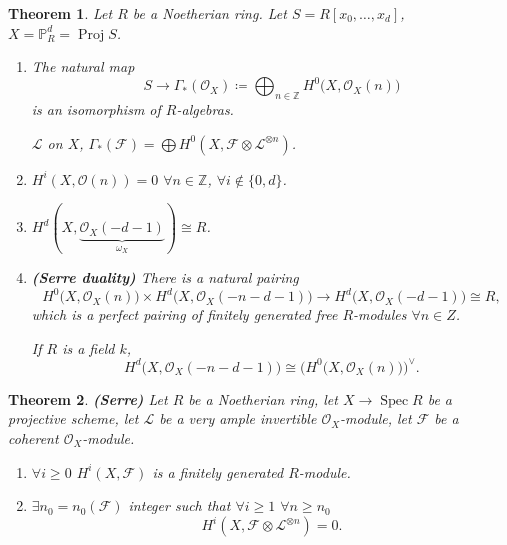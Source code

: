 \documentclass[12pt]{article}
\DeclareMathOperator{\Spec}{Spec}
\DeclareMathOperator{\Proj}{Proj}
\newtheorem*{theorem}{Theorem}
\theoremstyle{definition}
\theoremstyle{remark}
\newtheorem*{comment}{Comment}
\begin{document}
\begin{theorem}
Let $R$ be a Noetherian ring. Let $S=R[x_0,\ldots,x_d]$, $X=\mathbb{P}_R^d=\Proj S$.

\begin{enumerate}[label=\arabic*)]
\item The natural map
\[S\longrightarrow\Gamma_*(\mathcal{O}_X)\coloneqq\bigoplus_{n\in\mathbb{Z}}H^0\big(X,\mathcal{O}_X(n)\big)\]
is an isomorphism of $R$-algebras.

$\mathcal{L}$ on $X$, $\Gamma_*(\mathcal{F})=\bigoplus H^0(X,\mathcal{F}\otimes\mathcal{L}^{\otimes n})$.

\item $H^i(X,\mathcal{O}(n))=0$ $\forall n\in\mathbb{Z}$, $\forall i\notin\{0,d\}$.

\item $H^d(X,\underbrace{\mathcal{O}_X(-d-1)}_{\omega_X})\cong R$.

\item \emph{\textbf{(Serre duality)}} There is a natural pairing
\[H^0\big(X,\mathcal{O}_X(n)\big)\times H^d(X,\mathcal{O}_X(-n-d-1)\big)\longrightarrow H^d\big(X,\mathcal{O}_X(-d-1)\big)\cong R,\]
which is a perfect pairing of finitely generated free $R$-modules $\forall n\in Z$.

If $R$ is a field $k$,
\[H^d\big(X,\mathcal{O}_X(-n-d-1)\big)\cong\big(H^0\big(X,\mathcal{O}_X(n)\big)\big)^{\vee}.\]
\end{enumerate}
\end{theorem}

\begin{comment}
A pairing is just a bilinear map and ``perfect'' means that it is non-degenerate. Poincar\'{e} duality is a special case of Serre duality.
\end{comment}

\begin{theorem}
\emph{\textbf{(Serre)}} Let $R$ be a Noetherian ring, let $X\rightarrow\Spec R$ be a projective scheme, let $\mathcal{L}$ be a very ample invertible $\mathcal{O}_X$-module, let $\mathcal{F}$ be a coherent $\mathcal{O}_X$-module.

\begin{enumerate}[label=\arabic*)]
\item $\forall i\geq0$ $H^i(X,\mathcal{F})$ is a finitely generated $R$-module.

\item $\exists n_0=n_0(\mathcal{F})$ integer such that $\forall i\geq1$ $\forall n\geq n_0$
\[H^i(X,\mathcal{F}\otimes\mathcal{L}^{\otimes n})=0.\]
\end{enumerate}
\end{theorem}
\end{document}
